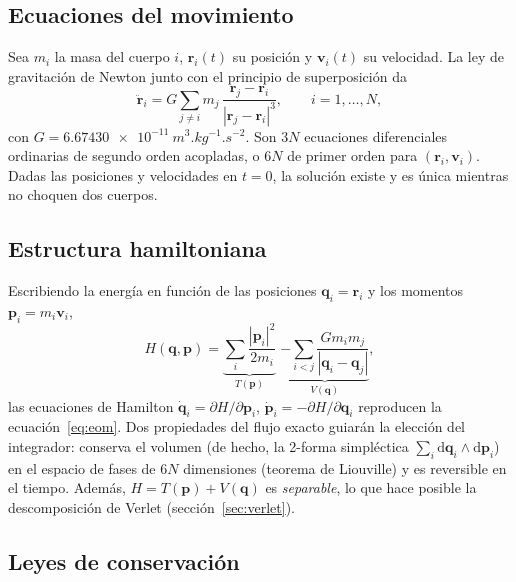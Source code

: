 \documentclass[11pt,a4paper]{article}
\newcommand{\vect}[1]{\mathbf{#1}}
\newcommand{\dd}{\mathrm{d}}
\begin{document}
\subsection{Ecuaciones del movimiento}

Sea $m_i$ la masa del cuerpo $i$, $\vect r_i(t)$ su posición y $\vect v_i(t)$ su velocidad.
La ley de gravitación de Newton junto con el principio de superposición da
\begin{equation}
  \ddot{\vect r}_i = G\sum_{j\ne i} m_j\,\frac{\vect r_j-\vect r_i}{|\vect r_j-\vect r_i|^{3}},
  \qquad i=1,\dots,N,
  \label{eq:eom}
\end{equation}
con $G=\SI{6.67430e-11}{m^3.kg^{-1}.s^{-2}}$. Son $3N$ ecuaciones diferenciales ordinarias
de segundo orden acopladas, o $6N$ de primer orden para $(\vect r_i,\vect v_i)$. Dadas las
posiciones y velocidades en $t=0$, la solución existe y es única mientras no choquen dos
cuerpos.

\subsection{Estructura hamiltoniana}

Escribiendo la energía en función de las posiciones $\vect q_i=\vect r_i$ y los momentos
$\vect p_i=m_i\vect v_i$,
\begin{equation}
  H(\vect q,\vect p)=\underbrace{\sum_i\frac{|\vect p_i|^2}{2m_i}}_{T(\vect p)}
  \;\underbrace{-\sum_{i<j}\frac{G m_i m_j}{|\vect q_i-\vect q_j|}}_{V(\vect q)},
  \label{eq:hamiltonian}
\end{equation}
las ecuaciones de Hamilton $\dot{\vect q}_i=\partial H/\partial\vect p_i$,
$\dot{\vect p}_i=-\partial H/\partial\vect q_i$ reproducen la ecuación~\eqref{eq:eom}. Dos
propiedades del flujo exacto guiarán la elección del integrador: conserva el volumen (de
hecho, la 2-forma simpléctica $\sum_i \dd\vect q_i\wedge \dd\vect p_i$) en el espacio de
fases de $6N$ dimensiones (teorema de Liouville) y es reversible en el tiempo. Además,
$H=T(\vect p)+V(\vect q)$ es \emph{separable}, lo que hace posible la descomposición de
Verlet (sección~\ref{sec:verlet}).

\subsection{Leyes de conservación}
\end{document}

